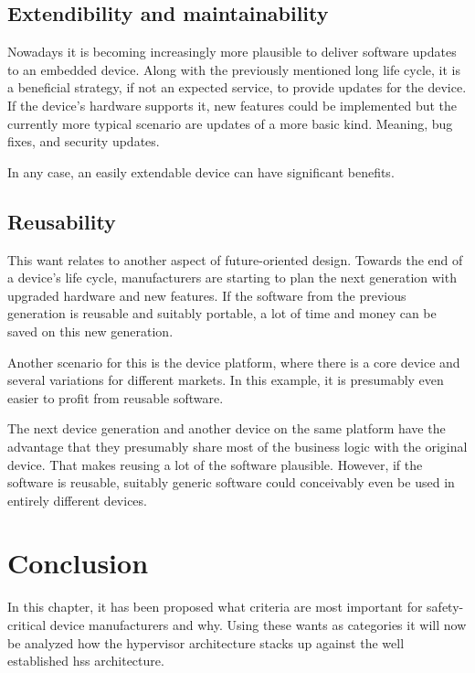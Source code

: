 \subsection{Extendibility and maintainability}
Nowadays it is becoming increasingly more plausible to deliver software updates to an embedded device. Along with the previously mentioned long life cycle, it is a beneficial strategy, if not an expected service, to provide updates for the device.
If the device's hardware supports it, new features could be implemented but the currently more typical scenario are updates of a more basic kind. Meaning, bug fixes, and security updates.

In any case, an easily extendable device can have significant benefits.
\subsection{Reusability}
This want relates to another aspect of future-oriented design. Towards the end of a device's life cycle, manufacturers are starting to plan the next generation with upgraded hardware and new features. If the software from the previous generation is reusable and suitably portable, a lot of time and money can be saved on this new generation.

Another scenario for this is the device platform, where there is a core device and several variations for different markets. In this example, it is presumably even easier to profit from reusable software.

The next device generation and another device on the same platform have the advantage that they presumably share most of the business logic with the original device. That makes reusing a lot of the software plausible. However, if the software is reusable, suitably generic software could conceivably even be used in entirely different devices.

\section{Conclusion}
In this chapter, it has been proposed what criteria are most important for safety-critical device manufacturers and why. Using these wants as categories it will now be analyzed how the hypervisor architecture stacks up against the well established \acrshort{hss} architecture.